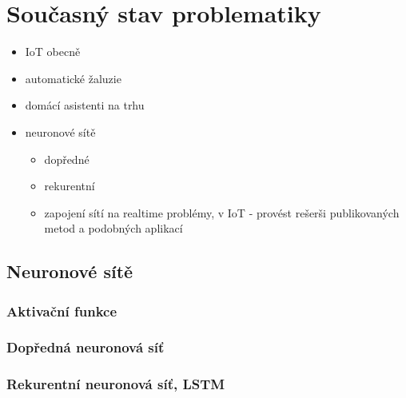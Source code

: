 \chapter{Současný stav problematiky} \label{chap:background}

\begin{itemize}
    \item IoT obecně
    \item automatické žaluzie
    \item domácí asistenti na trhu
    \item neuronové sítě
    \begin{itemize}
        \item dopředné
        \item rekurentní
        \item zapojení sítí na realtime problémy, v IoT - provést rešerši publikovaných metod a podobných aplikací  
    \end{itemize}  
\end{itemize}
\section{Neuronové sítě}
    \subsection{Aktivační funkce} \label{ssec:activationFcn}
    \subsection{Dopředná neuronová síť} \label{ssec:ffnn}
    \subsection{Rekurentní neuronová síť, LSTM} \label{ssec:rnn}
